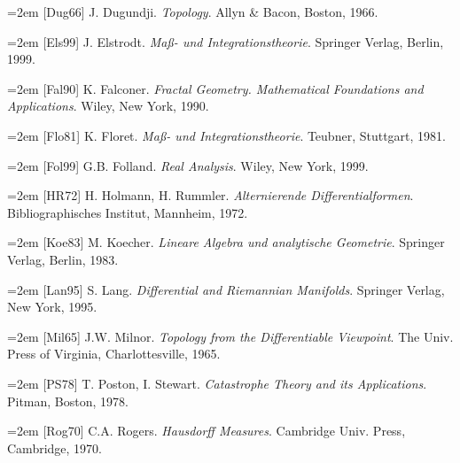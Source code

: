 \par\hangindent=2em [Dug66] J. Dugundji. \emph{Topology}. Allyn \& Bacon, Boston, 1966.\par

\par\hangindent=2em [Els99] J. Elstrodt. \emph{Maß- und Integrationstheorie}. Springer Verlag, Berlin, 1999.\par

\par\hangindent=2em [Fal90] K. Falconer. \emph{Fractal Geometry. Mathematical Foundations and Applications}. Wiley, New York, 1990.\par

\par\hangindent=2em [Flo81] K. Floret. \emph{Maß- und Integrationstheorie}. Teubner, Stuttgart, 1981.\par

\par\hangindent=2em [Fol99] G.B. Folland. \emph{Real Analysis}. Wiley, New York, 1999.\par

\par\hangindent=2em [HR72] H. Holmann, H. Rummler. \emph{Alternierende Differentialformen}. Bibliographisches Institut, Mannheim, 1972.\par

\par\hangindent=2em [Koe83] M. Koecher. \emph{Lineare Algebra und analytische Geometrie}. Springer Verlag, Berlin, 1983.\par

\par\hangindent=2em [Lan95] S. Lang. \emph{Differential and Riemannian Manifolds}. Springer Verlag, New York, 1995.\par

\par\hangindent=2em [Mil65] J.W. Milnor. \emph{Topology from the Differentiable Viewpoint}. The Univ. Press of Virginia, Charlottesville, 1965.\par

\par\hangindent=2em [PS78] T. Poston, I. Stewart. \emph{Catastrophe Theory and its Applications}. Pitman, Boston, 1978.\par

\par\hangindent=2em [Rog70] C.A. Rogers. \emph{Hausdorff Measures}. Cambridge Univ. Press, Cambridge, 1970.\par

